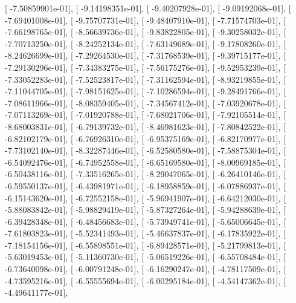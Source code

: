 \documentclass{article}
\begin{document}
       [ -7.50859901e-01],
       [ -9.14198351e-01],
       [ -9.40207928e-01],
       [ -9.09192068e-01],
       [ -7.69401008e-01],
       [ -9.75707731e-01],
       [ -9.48407910e-01],
       [ -7.71574703e-01],
       [ -7.66198765e-01],
       [ -8.56639736e-01],
       [ -9.83822805e-01],
       [ -9.30258032e-01],
       [ -7.70713250e-01],
       [ -8.24252134e-01],
       [ -7.63149689e-01],
       [ -9.17808260e-01],
       [ -8.24626699e-01],
       [ -7.29264530e-01],
       [ -7.31768539e-01],
       [ -9.39715177e-01],
       [ -7.29130296e-01],
       [ -7.34383275e-01],
       [ -7.56175276e-01],
       [ -9.52953239e-01],
       [ -7.33052283e-01],
       [ -7.52523817e-01],
       [ -7.31162594e-01],
       [ -8.93219855e-01],
       [ -7.11044705e-01],
       [ -7.98151625e-01],
       [ -7.10286594e-01],
       [ -9.28491766e-01],
       [ -7.08611966e-01],
       [ -8.08359405e-01],
       [ -7.34567412e-01],
       [ -7.03920678e-01],
       [ -7.07113269e-01],
       [ -7.01920788e-01],
       [ -7.68021706e-01],
       [ -7.92105514e-01],
       [ -8.68003831e-01],
       [ -6.79139732e-01],
       [ -8.46981623e-01],
       [ -7.80842522e-01],
       [ -6.82102179e-01],
       [ -6.76926310e-01],
       [ -6.95375169e-01],
       [ -6.82170977e-01],
       [ -7.73102140e-01],
       [ -8.32287446e-01],
       [ -6.52580580e-01],
       [ -7.58875304e-01],
       [ -6.54092476e-01],
       [ -6.74952558e-01],
       [ -6.65169580e-01],
       [ -8.00969185e-01],
       [ -6.50438116e-01],
       [ -7.33516265e-01],
       [ -8.29047065e-01],
       [ -6.26410146e-01],
       [ -6.59550137e-01],
       [ -6.43981971e-01],
       [ -6.18958859e-01],
       [ -6.07886937e-01],
       [ -6.15143620e-01],
       [ -6.72552158e-01],
       [ -5.96941907e-01],
       [ -6.64212030e-01],
       [ -5.88083842e-01],
       [ -5.98829419e-01],
       [ -5.87327264e-01],
       [ -5.94288639e-01],
       [ -6.39428348e-01],
       [ -6.48456683e-01],
       [ -5.73949741e-01],
       [ -5.65006645e-01],
       [ -7.61803823e-01],
       [ -5.52341493e-01],
       [ -5.46637837e-01],
       [ -6.17835922e-01],
       [ -7.18154156e-01],
       [ -6.55898551e-01],
       [ -6.89428571e-01],
       [ -5.21799813e-01],
       [ -5.63019453e-01],
       [ -5.11360730e-01],
       [ -5.06519226e-01],
       [ -6.55708484e-01],
       [ -6.73640098e-01],
       [ -6.00791248e-01],
       [ -6.16290247e-01],
       [ -4.78117509e-01],
       [ -4.73595216e-01],
       [ -6.55555694e-01],
       [ -6.00295184e-01],
       [ -4.54147362e-01],
       [ -4.49641177e-01],
\end{document}
